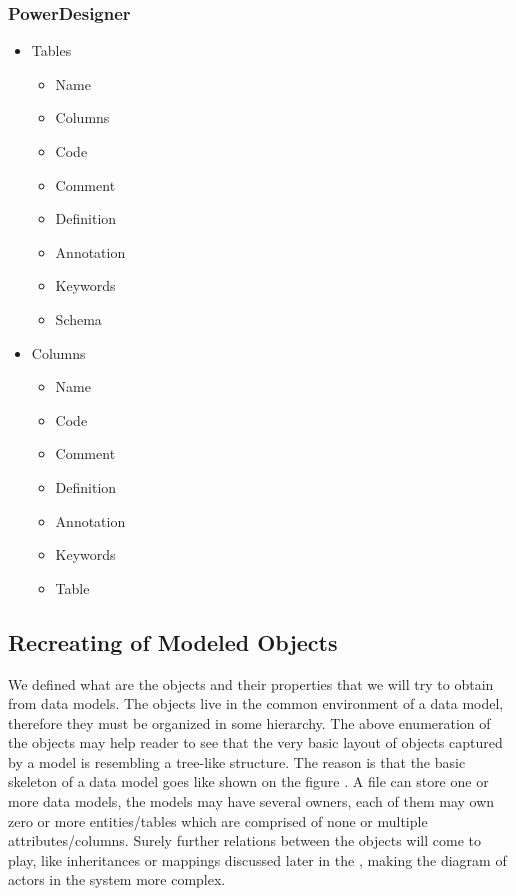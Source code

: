 \subsubsection{PowerDesigner}

\begin{itemize}
	\item Tables
	\begin{itemize}
		\item Name 
		\item Columns
		\item Code 
		\item Comment
		\item Definition
		\item Annotation
		\item Keywords
		\item Schema
	\end{itemize}
	\item Columns
	\begin{itemize}
		\item Name 
		\item Code 
		\item Comment
		\item Definition
		\item Annotation
		\item Keywords
		\item Table
	\end{itemize}
\end{itemize}

\subsection{Recreating of Modeled Objects}

We defined what are the objects and their properties that we will try to obtain from data models. 
The objects live in the common environment of a data model, therefore they must be organized in some hierarchy.
 The above enumeration of the objects may help reader to see that the very basic layout of objects captured by a model is resembling a tree-like structure. The reason is that the basic skeleton of a data model goes like shown on the figure . A file can store one or more data models, the models may have several owners, each of them may own zero or more entities/tables which are comprised of none or multiple attributes/columns. 
 Surely further relations between the objects will come to play, like inheritances or mappings discussed later in the , making the diagram of actors in the system more complex.
 

